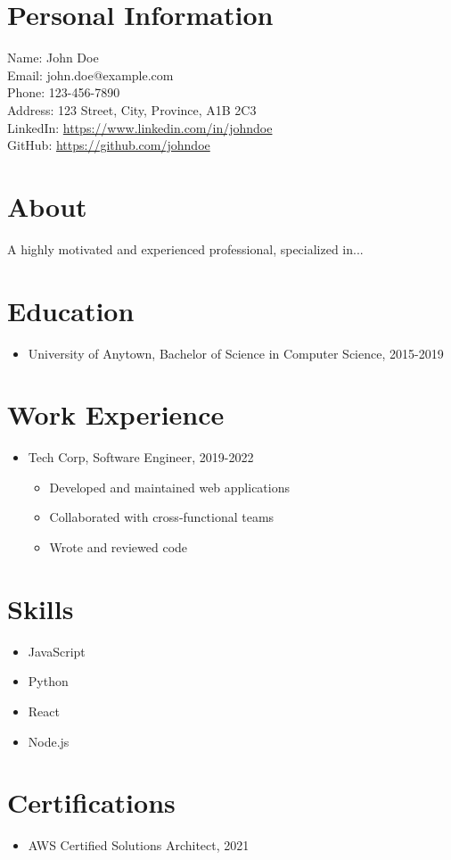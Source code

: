 \documentclass[letterpaper]{article}
\begin{document}
\section*{Personal Information}
Name: John Doe \\
Email: john.doe@example.com \\
Phone: 123-456-7890 \\
Address: 123 Street, City, Province, A1B 2C3 \\
LinkedIn: \url{https://www.linkedin.com/in/johndoe} \\
GitHub: \url{https://github.com/johndoe}

\section*{About}
A highly motivated and experienced professional, specialized in...

\section*{Education}
\begin{itemize}
\item University of Anytown, Bachelor of Science in Computer Science, 2015-2019
\end{itemize}

\section*{Work Experience}
\begin{itemize}
\item Tech Corp, Software Engineer, 2019-2022
  \begin{itemize}
  \item Developed and maintained web applications
  \item Collaborated with cross-functional teams
  \item Wrote and reviewed code
  \end{itemize}
\end{itemize}

\section*{Skills}
\begin{itemize}
\item JavaScript
\item Python
\item React
\item Node.js
\end{itemize}

\section*{Certifications}
\begin{itemize}
\item AWS Certified Solutions Architect, 2021
\end{itemize}
\end{document}
